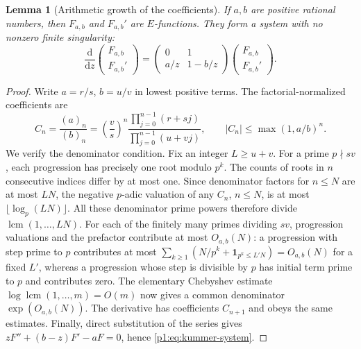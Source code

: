 \documentclass[11pt,a4paper]{article}
\newtheorem{lemma}[theorem]{Lemma}
\theoremstyle{definition}
\theoremstyle{remark}
\numberwithin{equation}{section}
\begin{document}
\begin{lemma}[Arithmetic growth of the coefficients]
\label{p1:lem:kummer-E}
If $a,b$ are positive rational numbers, then $F_{a,b}$ and $F_{a,b}'$
are $E$-functions. They form a system with no nonzero finite singularity:
\begin{equation}\label{p1:eq:kummer-system}
 \frac{\mathrm d}{\mathrm dz}
 \begin{pmatrix}F_{a,b}\\F_{a,b}'\end{pmatrix}
 =\begin{pmatrix}0&1\\a/z&1-b/z\end{pmatrix}
 \begin{pmatrix}F_{a,b}\\F_{a,b}'\end{pmatrix}.
\end{equation}
\end{lemma}
\begin{proof}
Write $a=r/s$, $b=u/v$ in lowest positive terms. The factorial-normalized
coefficients are
\[
 C_n=\frac{(a)_n}{(b)_n}
 =\left(\frac vs\right)^n
   \frac{\prod_{j=0}^{n-1}(r+sj)}{\prod_{j=0}^{n-1}(u+vj)},
 \qquad |C_n|\le\max(1,a/b)^n.
\]
We verify the denominator condition. Fix an integer $L\ge u+v$.
For a prime $p\nmid sv$, each progression has precisely one root modulo
$p^k$. The counts of roots in $n$ consecutive indices differ by at most
one. Since denominator factors for $n\le N$ are at most $LN$, the
negative $p$-adic valuation of any $C_n$, $n\le N$, is at most
$\lfloor\log_p(LN)\rfloor$. All these denominator prime powers therefore
divide $\operatorname{lcm}(1,\ldots,LN)$.
For each of the finitely many primes dividing $sv$, progression
valuations and the prefactor contribute at most $O_{a,b}(N)$: a
progression with step prime to $p$ contributes at most
$\sum_{k\ge1}(N/p^k+\mathbf1_{p^k\le L'N})=O_{a,b}(N)$ for a fixed
$L'$, whereas a progression whose step is divisible by $p$ has initial
term prime to $p$ and contributes zero.
The elementary Chebyshev estimate
$\log\operatorname{lcm}(1,\ldots,m)=O(m)$ now gives a common denominator
$\exp(O_{a,b}(N))$. The derivative has coefficients $C_{n+1}$ and obeys
the same estimates. Finally, direct substitution of the series gives
$zF''+(b-z)F'-aF=0$, hence \eqref{p1:eq:kummer-system}.
\end{proof}
\end{document}
